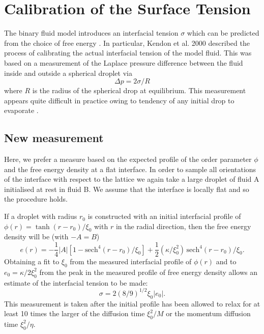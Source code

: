 %
%
%

\section{Calibration of the Surface Tension}

The binary fluid model introduces an interfacial tension $\sigma$ which
can be predicted from the choice of free energy \cite{swift,kendon}.
In particular, Kendon et al. 2000 described the process of calibrating
the actual interfacial tension of the model fluid. This was based on
a measurement of the Laplace pressure difference between the fluid
inside and outside a spherical droplet via
\begin{equation}
\Delta p = 2 \sigma / R
\end{equation}
where $R$ is the radius of the spherical drop at equilibrium. This
measurement appears quite difficult in practice owing to tendency of
any initial drop to evaporate \cite{yue2007}.

\subsection{New measurement}

Here, we prefer a measure based on the expected profile of the
order parameter $\phi$ and the free energy density at a flat interface.
In order to sample all orientations of the interface with respect to
the lattice we again take a large droplet of fluid A initialised at
rest in fluid B. We assume that the interface is locally flat and so
the procedure holds.

If a droplet with radius $r_0$ is constructed with an initial interfacial
profile of $\phi(r) = \tanh{(r - r_0) / \xi_0}$
with $r$ in the radial direction,  then the free energy density will be
(with $-A = B$)
\begin{equation}
 e(r) = -{\scriptstyle \frac{1}{4}} |A| [1 - \mathrm{sech}^4 (r-r_0)/\xi_0]
+ {\scriptstyle \frac{1}{2}}
 (\kappa/\xi_0^2)\, \mathrm{sech}^4{(r-r_0)/\xi_0}.
\end{equation}
Obtaining a fit to $\xi_0$ from the measured interfacial profile of
$\phi (r)$ and to $ e_0 = \kappa / 2 \xi_0^2$ from the peak in the measured
profile of free energy
density allows an estimate of the interfacial tension to be made:
\begin{equation}
\sigma = 2(8/9)^{1/2} \xi_0 |e_0|.
\end{equation}
This measurement is taken after the initial profile has been allowed
to relax for at least 10 times the larger of the diffusion time
$\xi_0^2 / M$ or the momentum diffusion time $\xi_0^2 / \eta$.


